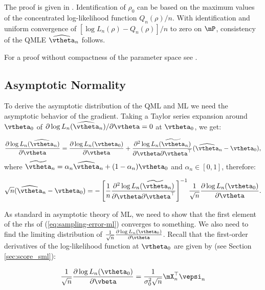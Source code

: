 \documentclass[english,12pt]{book}\usepackage[]{graphicx}\usepackage[]{xcolor}
\begin{document}
The proof is given in \cite{lee2004asymptotic}. Identification of $\rho_0$ can be based on the maximum values of the concentrated log-likelihood function $Q_n(\rho) / n$. With identification and uniform convergence of $\left[\log L_n(\rho) - Q_n(\rho)\right] / n$ to zero on $\mP$, consistency of the QMLE $\widehat{\vtheta}_n$ follows.

For a proof without compactness of the parameter space see \cite{liu2022consistency}.

\subsection{Asymptotic Normality}

To derive the asymptotic distribution of the QML and ML we need the asymptotic behavior of the gradient. Taking a Taylor series expansion around $\vtheta_0$ of $\partial \log L_n(\widehat{\vtheta}_n)/ \partial \vtheta = 0$ at $\vtheta_0$, we get:

\begin{equation}
  \frac{\partial \log L_n(\widehat{\vtheta}_n)}{\partial \vtheta} =  \frac{\partial \log L_n(\vtheta_0)}{\partial \vtheta} + \frac{\partial^2 \log L_n(\widetilde{\vtheta}_n)}{\partial \vtheta \partial \vtheta^\top}(\widehat{\vtheta}_n - \vtheta_0),
\end{equation}
%
where $\widetilde{\vtheta}_n = \alpha_n \widehat{\vtheta}_n + (1 - \alpha_n)\vtheta_0$ and $\alpha_n\in \left[ 0, 1\right]$, therefore:

\begin{equation}\label{eq:sampling-error-ml}
  \sqrt{n}(\widehat{\vtheta}_n - \vtheta_0) = - \left[\frac{1}{n}\frac{\partial^2 \log L_n(\widetilde{\vtheta}_n)}{\partial \vtheta \partial \vtheta^\top}\right]^{-1}\frac{1}{\sqrt{n}}\frac{\partial \log L_n(\vtheta_0)}{\partial \vtheta}.
\end{equation}

As standard in asymptotic theory of ML, we need to show that the first element of the rhs of (\ref{eq:sampling-error-ml}) converges to something. We also need to find the limiting distribution of $\frac{1}{\sqrt{n}}\frac{\partial \log L_n(\vtheta_0)}{\partial \vtheta}$. Recall that the first-order derivatives of the log-likelihood function at $\vtheta_0$ are given by (see Section \ref{sec:score_sml}):

\begin{equation}
	\frac{1}{\sqrt{n}}\frac{\partial \log L_n(\vtheta_0)}{\partial \vbeta} = \frac{1}{\sigma^2_0\sqrt{n}}\mX_n^\top\vepsi_n
\end{equation}	
\end{document}
